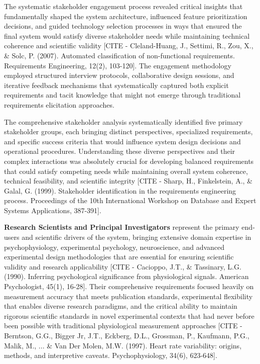 \documentclass[12pt,a4paper]{report}
\begin{document}
The systematic stakeholder engagement process revealed critical insights that fundamentally shaped the system
architecture, influenced feature prioritization decisions, and guided technology selection processes in ways that
ensured the final system would satisfy diverse stakeholder needs while maintaining technical coherence and scientific
validity [CITE - Cleland-Huang, J., Settimi, R., Zou, X., \& Solc, P. (2007). Automated classification of non-functional requirements. Requirements Engineering, 12(2), 103-120].
The engagement methodology employed structured interview protocols, collaborative design sessions, and iterative
feedback mechanisms that systematically captured both explicit requirements and tacit knowledge that might not emerge
through traditional requirements elicitation approaches.

The comprehensive stakeholder analysis systematically identified five primary stakeholder groups, each bringing distinct
perspectives, specialized requirements, and specific success criteria that would influence system design decisions and
operational procedures. Understanding these diverse perspectives and their complex interactions was absolutely crucial
for developing balanced requirements that could satisfy competing needs while maintaining overall system coherence,
technical feasibility, and scientific
integrity [CITE - Sharp, H., Finkelstein, A., \& Galal, G. (1999). Stakeholder identification in the requirements engineering process. Proceedings of the 10th International Workshop on Database and Expert Systems Applications, 387-391].

\textbf{Research Scientists and Principal Investigators} represent the primary end-users and scientific drivers of the
system, bringing extensive domain expertise in psychophysiology, experimental psychology, neuroscience, and advanced
experimental design methodologies that are essential for ensuring scientific validity and research
applicability [CITE - Cacioppo, J.T., \& Tassinary, L.G. (1990). Inferring psychological significance from physiological signals. American Psychologist, 45(1), 16-28].
Their comprehensive requirements focused heavily on measurement accuracy that meets publication standards, experimental
flexibility that enables diverse research paradigms, and the critical ability to maintain rigorous scientific standards
in novel experimental contexts that had never before been possible with traditional physiological measurement
approaches [CITE - Berntson, G.G., Bigger Jr, J.T., Eckberg, D.L., Grossman, P., Kaufmann, P.G., Malik, M., ... \& Van Der Molen, M.W. (1997). Heart rate variability: origins, methods, and interpretive caveats. Psychophysiology, 34(6), 623-648].
\end{document}
